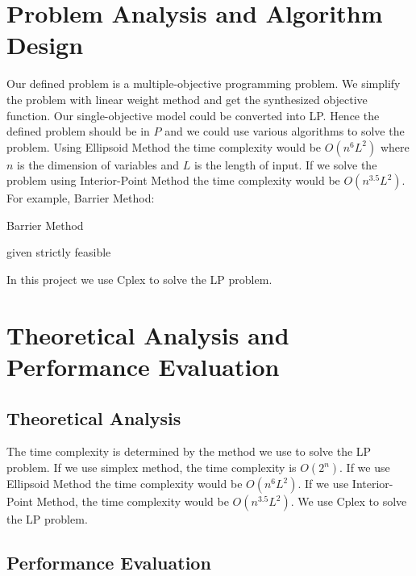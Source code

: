 \documentclass[12pt,a4paper]{article}
\begin{document}
\section{Problem Analysis and Algorithm Design}
Our defined problem is a multiple-objective programming problem. We simplify the problem with linear weight method and get the synthesized objective function. Our single-objective model could be converted into LP. Hence the defined problem should be in $P$ and we could use various algorithms to solve the problem. Using Ellipsoid Method the time complexity would be $O(n^6L^2)$ where $n$ is the dimension of variables and $L$ is the length of input. If we solve the problem using Interior-Point Method the time complexity would be $O(n^{3.5}L^2)$.\\
For example, Barrier Method\cite{Convex}:\\
\begin{algorithm}[H]
\caption{Barrier Method}
 given strictly feasible\\
\end{algorithm}
In this project we use Cplex to solve the LP problem.
\newpage

\section{Theoretical Analysis and Performance Evaluation}
\subsection{Theoretical Analysis}
The time complexity is determined by the method we use to solve the LP problem. If we use simplex method, the time complexity is $O(2^n)$. If we use Ellipsoid Method the time complexity would be $O(n^6L^2)$. If we use Interior-Point Method, the time complexity would be $O(n^{3.5}L^2)$. We use Cplex to solve the LP problem.
\subsection{Performance Evaluation}
\end{document}
